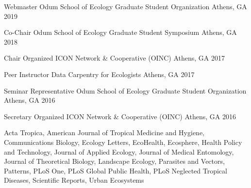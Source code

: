 
\begin{cvhonors}
\cvhonor
    {Webmaster} %
    {Odum School of Ecology Graduate Student Organization} %
    {Athens, GA} %
    {2019} %

\cvhonor
    {Co-Chair} %
    {Odum School of Ecology Graduate Student Symposium} %
    {Athens, GA} %
    {2018} %

\cvhonor
    {Chair} %
    {Organized ICON Network \& Cooperative (OINC)} %
    {Athens, GA} %
    {2017} %

\cvhonor
    {Peer Instructor} %
    {Data Carpentry for Ecologists} %
    {Athens, GA} %
    {2017} %

\cvhonor
    {Seminar Representative} %
    {Odum School of Ecology Graduate Student Organization} %
    {Athens, GA} %
    {2016} %

\cvhonor
    {Secretary} %
    {Organized ICON Network \& Cooperative (OINC)} %
    {Athens, GA} %
    {2016} %

\end{cvhonors}


Acta Tropica, American Journal of Tropical Medicine and Hygiene, Communications Biology, Ecology Letters, EcoHealth, Ecosphere, Health Policy and Technology, Journal of Applied Ecology, Journal of Medical Entomology, Journal of Theoretical Biology, Landscape Ecology, Parasites and Vectors, Patterns, PLoS One, PLoS Global Public Health, PLoS Neglected Tropical Diseases, Scientific Reports, Urban Ecosystems



